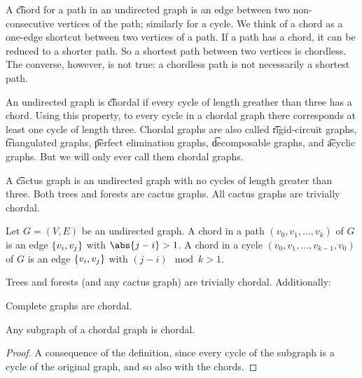 
\sbasic
















\sstart
{}


A \t{chord} for a path in an undirected graph is an edge between two non-consecutive vertices of the path; similarly for a cycle.
We think of a chord as a one-edge shortcut between two vertices of a path.
If a path has a chord, it can be reduced to a shorter path.
So a shortest path between two vertices is chordless.
The converse, however, is not true: a chordless path is not necessarily a shortest path.

An undirected graph is \t{chordal} if every cycle of length greather than three has a chord.
Using this property, to every cycle in a chordal graph there corresponds at least one cycle of length three.
Chordal graphs are also called \t{rigid-circuit graphs}, \t{triangulated graphs}, \t{perfect elimination graphs}, \t{decomposable graphs}, and \t{acyclic graphs}.
But we will only ever call them chordal graphs.

A \t{cactus graph} is an undirected graph with no cycles of length greater than three.
Both trees and forests are cactus graphs.
All cactus graphs are trivially chordal.



Let $G = (V, E)$ be an undirected graph.
A chord in a path $(v_0, v_1, \dots, v_k)$ of $G$ is an edge $\{v_i, v_j\}$ with $\abs{j - i} > 1$.
A chord in a cycle $(v_0, v_1, \dots, v_{k-1}, v_0)$ of $G$ is an edge $\{v_i, v_j\}$ with $(j - i) \mod k > 1$.


Trees and forests (and any cactus graph) are trivially chordal.
Additionally:

\begin{prop}
  Complete graphs are chordal.
\end{prop}


\begin{prop}
  Any subgraph of a chordal graph is chordal.

  \begin{proof}
    A consequence of the definition, since every cycle of the subgraph is a cycle of the original graph, and so also with the chords.
  \end{proof}
\end{prop}
\strats
